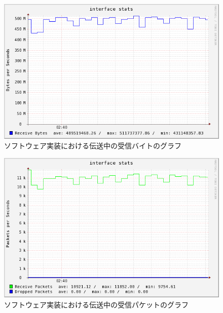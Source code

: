 \begin{figure}[htbp]
  \begin{center}
    \includegraphics[bb=0 0 597 374,width=11.8cm]{img/lo-bytes-graph.png}
  \end{center}
  \caption{ソフトウェア実装における伝送中の受信バイトのグラフ}
  \label{fig:lo-bytes-graph}
\end{figure}

\begin{figure}[htbp]
  \begin{center}
    \includegraphics[bb=0 0 597 388,width=11.8cm]{img/lo-packets-graph.png}
  \end{center}
  \caption{ソフトウェア実装における伝送中の受信パケットのグラフ}
  \label{fig:lo-packets-graph}
\end{figure}

